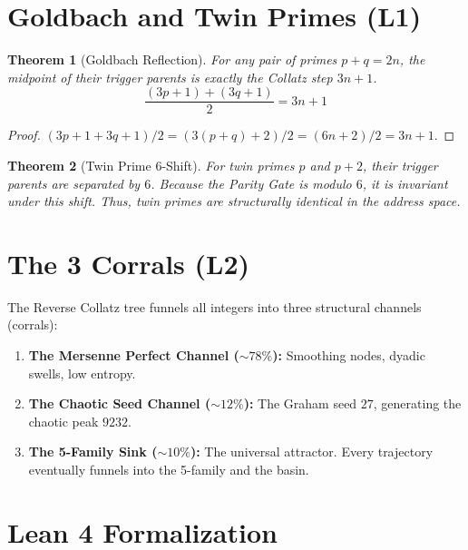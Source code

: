 \documentclass[11pt]{article}
\newtheorem{theorem}{Theorem}
\theoremstyle{definition}
\theoremstyle{remark}
\begin{document}
\section{Goldbach and Twin Primes (L1)}

\begin{theorem}[Goldbach Reflection]
For any pair of primes \(p + q = 2n\), the midpoint of their trigger parents is exactly the Collatz step \(3n+1\).
\[ \frac{(3p+1) + (3q+1)}{2} = 3n+1 \]
\end{theorem}

\begin{proof}
\((3p+1+3q+1)/2 = (3(p+q)+2)/2 = (6n+2)/2 = 3n+1\).
\end{proof}

\begin{theorem}[Twin Prime 6-Shift]
For twin primes \(p\) and \(p+2\), their trigger parents are separated by \(6\). Because the Parity Gate is modulo \(6\), it is invariant under this shift. Thus, twin primes are structurally identical in the address space.
\end{theorem}

\section{The 3 Corrals (L2)}

The Reverse Collatz tree funnels all integers into three structural channels (corrals):
\begin{enumerate}
    \item \textbf{The Mersenne Perfect Channel (\(\sim 78\%\)):} Smoothing nodes, dyadic swells, low entropy.
    \item \textbf{The Chaotic Seed Channel (\(\sim 12\%\)):} The Graham seed \(27\), generating the chaotic peak \(9232\).
    \item \textbf{The 5-Family Sink (\(\sim 10\%\)):} The universal attractor. Every trajectory eventually funnels into the 5-family and the basin.
\end{enumerate}

\section{Lean 4 Formalization}
\end{document}
